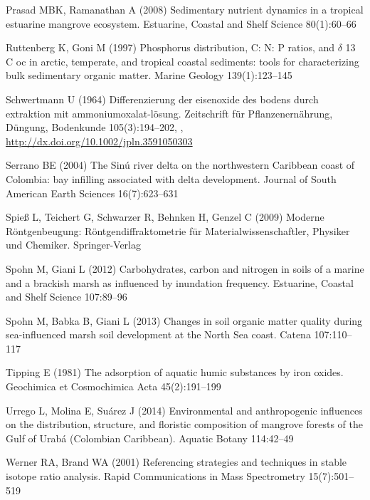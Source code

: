 \begin{thebibliography}{24}
Prasad MBK, Ramanathan A (2008) {Sedimentary nutrient dynamics in a tropical
  estuarine mangrove ecosystem}. {Estuarine, Coastal and Shelf Science}
  80(1):60--66

Ruttenberg K, Goni M (1997) {Phosphorus distribution, C: N: P ratios, and
  $\delta$ 13 C oc in arctic, temperate, and tropical coastal sediments: tools
  for characterizing bulk sedimentary organic matter}. Marine Geology
  139(1):123--145

Schwertmann U (1964) Differenzierung der eisenoxide des bodens durch extraktion
  mit ammoniumoxalat-l{\"o}sung. Zeitschrift f{\"u}r Pflanzenern{\"a}hrung,
  D{\"u}ngung, Bodenkunde 105(3):194--202, ,
  \urlprefix\url{http://dx.doi.org/10.1002/jpln.3591050303}

Serrano BE (2004) {The Sin{\'u} river delta on the northwestern Caribbean coast
  of Colombia: bay infilling associated with delta development}. Journal of
  South American Earth Sciences 16(7):623--631

Spie{\ss} L, Teichert G, Schwarzer R, Behnken H, Genzel C (2009) {Moderne
  R{\"o}ntgenbeugung: R{\"o}ntgendiffraktometrie f{\"u}r
  Materialwissenschaftler, Physiker und Chemiker}. Springer-Verlag

Spohn M, Giani L (2012) {Carbohydrates, carbon and nitrogen in soils of a
  marine and a brackish marsh as influenced by inundation frequency}.
  Estuarine, Coastal and Shelf Science 107:89--96

Spohn M, Babka B, Giani L (2013) {Changes in soil organic matter quality during
  sea-influenced marsh soil development at the North Sea coast}. Catena
  107:110--117

Tipping E (1981) {The adsorption of aquatic humic substances by iron oxides}.
  {Geochimica et Cosmochimica Acta} 45(2):191--199

Urrego L, Molina E, Su{\'a}rez J (2014) {Environmental and anthropogenic
  influences on the distribution, structure, and floristic composition of
  mangrove forests of the Gulf of Urab{\'a} (Colombian Caribbean)}. {Aquatic
  Botany} 114:42--49

Werner RA, Brand WA (2001) {Referencing strategies and techniques in stable
  isotope ratio analysis}. Rapid Communications in Mass Spectrometry
  15(7):501--519

\end{thebibliography}


